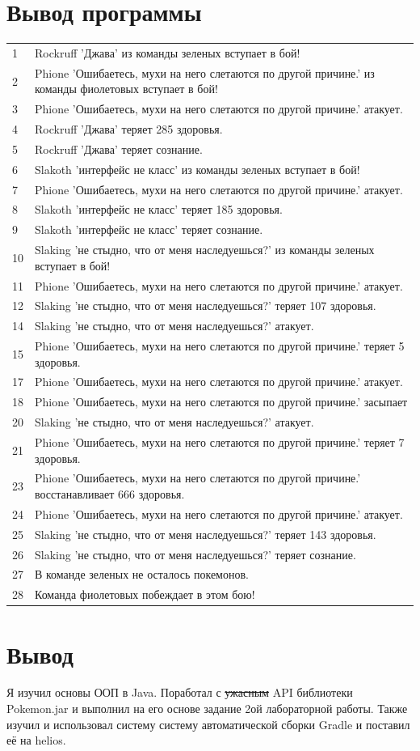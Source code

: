 \documentclass[11pt]{article}
\begin{document}
\section{Вывод программы}
\label{sec:orgbd3c5c6}
\scriptsize
\begin{tabular}{ll}
1 & Rockruff 'Джава' из команды зеленых вступает в бой!\\
2 & Phione 'Ошибаетесь, мухи на него слетаются по другой причине.' из команды фиолетовых вступает в бой!\\
3 & Phione 'Ошибаетесь, мухи на него слетаются по другой причине.' атакует.\\
4 & Rockruff 'Джава' теряет 285 здоровья.\\
5 & Rockruff 'Джава' теряет сознание.\\
6 & Slakoth 'интерфейс не класс' из команды зеленых вступает в бой!\\
7 & Phione 'Ошибаетесь, мухи на него слетаются по другой причине.' атакует.\\
8 & Slakoth 'интерфейс не класс' теряет 185 здоровья.\\
9 & Slakoth 'интерфейс не класс' теряет сознание.\\
10 & Slaking 'не стыдно, что от меня наследуешься?' из команды зеленых вступает в бой!\\
11 & Phione 'Ошибаетесь, мухи на него слетаются по другой причине.' атакует.\\
12 & Slaking 'не стыдно, что от меня наследуешься?' теряет 107 здоровья.\\
14 & Slaking 'не стыдно, что от меня наследуешься?' атакует.\\
15 & Phione 'Ошибаетесь, мухи на него слетаются по другой причине.' теряет 5 здоровья.\\
17 & Phione 'Ошибаетесь, мухи на него слетаются по другой причине.' атакует.\\
18 & Phione 'Ошибаетесь, мухи на него слетаются по другой причине.' засыпает\\
20 & Slaking 'не стыдно, что от меня наследуешься?' атакует.\\
21 & Phione 'Ошибаетесь, мухи на него слетаются по другой причине.' теряет 7 здоровья.\\
23 & Phione 'Ошибаетесь, мухи на него слетаются по другой причине.' восстанавливает 666 здоровья.\\
24 & Phione 'Ошибаетесь, мухи на него слетаются по другой причине.' атакует.\\
25 & Slaking 'не стыдно, что от меня наследуешься?' теряет 143 здоровья.\\
26 & Slaking 'не стыдно, что от меня наследуешься?' теряет сознание.\\
27 & В команде зеленых не осталось покемонов.\\
28 & Команда фиолетовых побеждает в этом бою!\\
\end{tabular}
\normalsize

\section{Вывод}
\label{sec:org6c014d7}
Я изучил основы ООП в Java. Поработал с \sout{ужасным} API библиотеки Pokemon.jar и выполнил на его основе задание 2ой лабораторной работы. Также изучил и использовал систему систему автоматической сборки Gradle и поставил её на helios.
\end{document}
